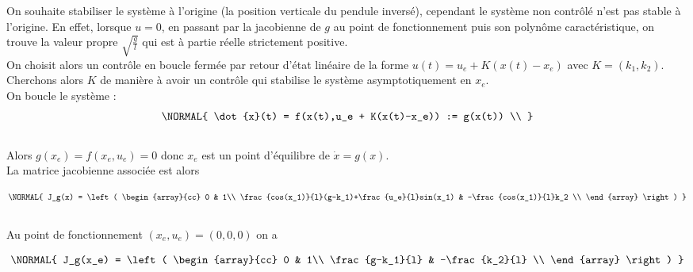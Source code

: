 \documentclass[11pt,french]{article} %
\begin{document}
\quad On souhaite stabiliser le système à l'origine (la position verticale du pendule inversé), cependant le système non contrôlé n'est pas stable à l'origine. En effet, lorsque $u = 0$, en passant par la jacobienne de $g$ au point de fonctionnement puis son polynôme caractéristique, on trouve la valeur propre $\sqrt{\frac{g}{l}}$ qui est à partie réelle strictement positive.\\


\quad On choisit alors un contrôle en boucle fermée par retour d'état linéaire de la forme $u(t) = u_e + K(x(t) - x_e)$ avec $K = (k_1, k_2)$. Cherchons alors $K$ de manière à avoir un contrôle qui stabilise le système asymptotiquement en $x_e$.\\

\quad On boucle le système :\\

\begin{equation}
	\NORMAL{
			\dot{x}(t) = f(x(t),u_e + K(x(t)-x_e)) := g(x(t)) \\
	}
\end{equation}\\

\quad Alors $g(x_e) = f(x_e, u_e) = 0$ donc $x_e$ est un point d'équilibre de $\dot{x} = g(x)$. \\

\quad La matrice jacobienne associée est alors 

\begin{equation}
	\NORMAL{
		J_g(x) = 
		\left(
		\begin{array}{cc}
			0 & 1\\
			\frac{cos(x_1)}{l}(g-k_1)+\frac{u_e}{l}sin(x_1) & -\frac{cos(x_1)}{l}k_2 \\
    \end{array}
  \right)
	}
\end{equation}\\

\quad Au point de fonctionnement $(x_e,u_e) = (0,0,0)$ on a 

\begin{equation}
	\NORMAL{
		J_g(x_e) = 
		\left(
		\begin{array}{cc}
			0 & 1\\
			\frac{g-k_1}{l} & -\frac{k_2}{l} \\
    \end{array}
  \right)
	}
\end{equation}\\
\end{document}
